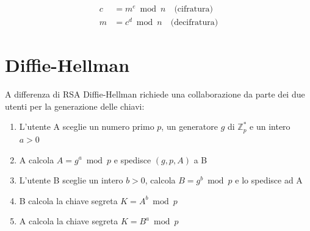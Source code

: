 \documentclass[12pt, a4paper]{report}
\begin{document}
\begin{align}
    c &= m^e \bmod n \quad \text{(cifratura)} \\
    m &= c^d \bmod n \quad \text{(decifratura)}
\end{align}

\section{Diffie-Hellman}

A differenza di RSA Diffie-Hellman richiede una collaborazione da parte dei due utenti per la generazione delle chiavi:
\begin{enumerate}
    \item L'utente A sceglie un numero primo $p$, un generatore $g$ di $\mathbb{Z}^*_p$ e un intero $a > 0$
    \item A calcola $A = g^a \bmod p$ e spedisce $(g, p, A)$ a B
    \item L'utente B sceglie un intero $b > 0$, calcola $B = g^b \bmod p$ e lo spedisce ad A
    \item B calcola la chiave segreta $K = A^b \bmod p$
    \item A calcola la chiave segreta $K = B^a \bmod p$
\end{enumerate}
\end{document}
